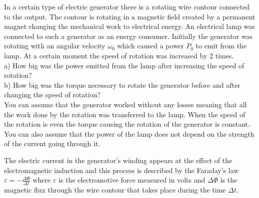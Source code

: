 {\ifEngStatement
In a certain type of electric generator there is a rotating wire contour connected to the output. The contour is rotating in a magnetic field created by a permanent magnet changing the mechanical work to electrical energy. An electrical lamp was connected to such a generator as an energy consumer. Initially the generator was rotating with an angular velocity $\omega_0$ which caused a power $P_0$ to emit from the lamp. At a certain moment the speed of rotation was increased by 2 times.\\
a) How big was the power emitted from the lamp after increasing the speed of rotation?\\
b) How big was the torque necessary to rotate the generator before and after changing the speed of rotation?\\
You can assume that the generator worked without any losses meaning that all the work done by the rotation was transferred to the lamp. When the speed of the rotation is even the torque causing the rotation of the generator is constant. You can also assume that the power of the lamp does not depend on the strength of the current going through it.
\fi


\ifEngHint
The electric current in the generator’s winding appears at the effect of the electromagnetic induction and this process is described by the Faraday’s law $\varepsilon = -\frac{\Delta\Phi}{\Delta t}$ where $\varepsilon$ is the electromotive force measured in volts and $\Delta\Phi$ is the magnetic flux through the wire contour that takes place during the time $\Delta t$.
\fi


}
